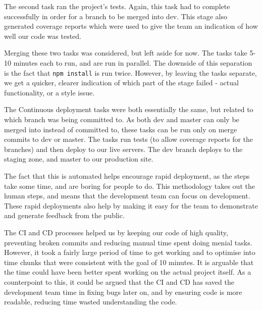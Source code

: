 \documentclass{l3proj}
\begin{document}
The second task ran the project's tests. Again, this task had to complete successfully in
 order for a branch to be merged into dev. This stage also generated coverage reports which
 were used to give the team an indication of how well our code was tested.

 

Merging these two tasks was considered, but left aside for now. The tasks take 5-10 minutes
 each to run, and are run in parallel. The downside of this separation is the fact that \texttt{npm install}
 is run twice. However, by leaving the tasks separate, we get a quicker, clearer indication
 of which part of the stage failed - actual functionality, or a style issue.

 

The Continuous deployment tasks were both essentially the same, but related to which branch was being
 committed to. As both dev and master can only be merged into instead of committed to, these tasks can
 be run only on merge commits to dev or master. The tasks run tests (to allow coverage reports for the branches)
 and then deploy to our live servers. The dev branch deploys to the staging zone, and
 master to our production site.

The fact that this is automated helps encourage rapid deployment, as the steps take some time, and are
 boring for people to do. This methodology takes out the human steps, and means that the development team
 can focus on development. These rapid deployments also help by making it easy for the team to demonstrate
 and generate feedback from the public.


The CI and CD processes helped us by keeping our code of high quality, preventing broken commits and reducing
 manual time spent doing menial tasks. However, it took a fairly large period of time to get working and to
 optimise into time chunks that were consistent with the goal of 10 minutes. It is arguable that the time
 could have been better spent working on the actual project itself. As a counterpoint to this, it could be
 argued that the CI and CD has saved the development team time in fixing bugs later on, and by ensuring code is more
 readable, reducing time wasted understanding the code.

\end{document}

